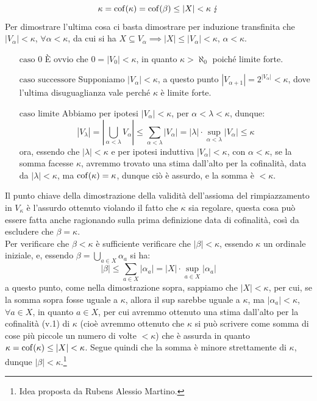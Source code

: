 \begin{soln}
\begin{enumerate}[(1)]
		\[ \kappa = \operatorname{cof}(\kappa) = \operatorname{cof}(\beta) \leq |X| < \kappa \; \lightning
			\]
		Per dimostrare l'ultima cosa ci basta dimostrare per induzione transfinita che $|V_\alpha| < \kappa$, $\forall \alpha < \kappa$, da cui si ha $X \subseteq V_\alpha \implies |X| \leq |V_\alpha| < \kappa$, $\alpha < \kappa$.
		\begin{itemize}
			\item[$\boxed{\text{caso 0}}$] È ovvio che $0 = |V_0| < \kappa$, in quanto $\kappa > \aleph_0$ poiché limite forte. 
			\item[$\boxed{\text{caso successore}}$] Supponiamo $|V_\alpha| < \kappa$, a questo punto $|V_{\alpha + 1}| = 2^{|V_\alpha|} < \kappa$, dove l'ultima disuguaglianza vale perché $\kappa$ è limite forte.
			\item[$\boxed{\text{caso limite}}$] Abbiamo per ipotesi $|V_\alpha| < \kappa$, per $\alpha < \lambda < \kappa$, dunque:
			\[ |V_\lambda| = \left\lvert \bigcup_{\alpha < \lambda} V_\alpha\right\rvert \leq \sum_{\alpha < \lambda} |V_\alpha| = |\lambda| \cdot \sup_{\alpha < \lambda} |V_\alpha| \leq \kappa
				\]
			ora, essendo che $|\lambda| < \kappa$ e per ipotesi induttiva $|V_\alpha| < \kappa$, con $\alpha < \kappa$, se la somma facesse $\kappa$, avremmo trovato una stima dall'alto per la cofinalità, data da $|\lambda| < \kappa$, ma $\operatorname{cof}(\kappa) = \kappa$, dunque ciò è assurdo, e la somma è $<\kappa$.
		\end{itemize}
	\end{enumerate}
\end{soln}

\begin{remark}
	Il punto chiave della dimostrazione della validità dell'assioma del rimpiazzamento in $V_\kappa$ è l'assurdo ottenuto violando il fatto che $\kappa$ sia regolare, questa cosa può essere fatta anche ragionando sulla prima definizione data di cofinalità, così da escludere che $\beta = \kappa$.\\
	Per verificare che $\beta < \kappa$ è sufficiente verificare che $|\beta| < \kappa$, essendo $\kappa$ un ordinale iniziale, e, essendo $\beta = \bigcup_{a \in X} \alpha_a$ si ha:
	\[ |\beta| \leq \sum_{a \in X} |\alpha_a| = |X| \cdot \sup_{a \in X} |\alpha_a|
		\]
	a questo punto, come nella dimostrazione sopra, sappiamo che $|X| < \kappa$, per cui, se la somma sopra fosse uguale a $\kappa$, allora il sup sarebbe uguale a $\kappa$, ma $|\alpha_a| < \kappa$, $\forall a \in X$, in quanto $a \in X$, per cui avremmo ottenuto una stima dall'alto per la cofinalità (v.1) di $\kappa$ (cioè avremmo ottenuto che $\kappa$ si può scrivere come somma di cose più piccole
	un numero di volte $< \kappa$) che è assurda in quanto $\kappa = \operatorname{cof}(\kappa) \leq |X| < \kappa$. Segue quindi che la somma è minore strettamente di $\kappa$, dunque $|\beta| < \kappa$.\footnote{Idea proposta da Rubens Alessio Martino.}
\end{remark}

